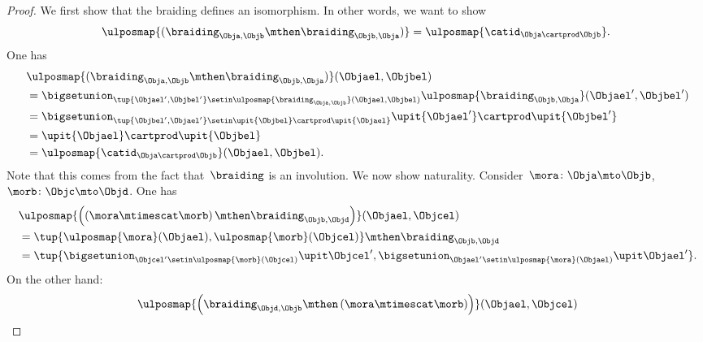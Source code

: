 \begin{proof}
    We first show that the braiding defines an isomorphism.
    In other words, we want to show
    \begin{equation*}
        \ulposmap{(\braiding_{\Obja,\Objb}\mthen \braiding_{\Objb,\Obja})}=\ulposmap{\catid_{\Obja \cartprod \Objb}}.
    \end{equation*}
    One has
    \begin{equation*}
        \begin{aligned}
            ~ & \ulposmap{(\braiding_{\Obja,\Objb}\mthen \braiding_{\Objb,\Obja})}(\Objael,\Objbel) \\
              & =\bigsetunion_{\tup{\Objael',\Objbel'}\setin \ulposmap{\braiding_{\Obja,\Objb}}(\Objael,\Objbel)}\ulposmap{\braiding_{\Objb,\Obja}}(\Objael',\Objbel') \\
              & =\bigsetunion_{\tup{\Objbel',\Objael'}\setin \upit\{\Objbel\}\cartprod \upit\{\Objael\}}\upit\{ \Objael'\}\cartprod \upit\{ \Objbel'\} \\
              & =\upit\{\Objael\} \cartprod \upit\{\Objbel\} \\
              & =\ulposmap{\catid_{\Obja\cartprod \Objb}}(\Objael,\Objbel).
        \end{aligned}
    \end{equation*}
    Note that this comes from the fact that~$\braiding$ is an involution.
    We now show naturality.
    Consider~$\mora \colon \Obja \mto \Objb$,~$\morb\colon \Objc \mto \Objd$.
    One has
    \begin{equation}
        \label{eq:braid-upos-natural-a}
        \begin{aligned}
            ~ & \ulposmap{\left(\left( \mora \mtimescat \morb\right)\mthen \braiding_{ \Objb, \Objd}\right)}(\Objael,\Objcel) \\
              & = \tup{\ulposmap{\mora}(\Objael),\ulposmap{\morb}(\Objcel)}\mthen \braiding_{ \Objb, \Objd} \\
              & =\tup{\bigsetunion_{\Objcel'\setin \ulposmap{\morb}(\Objcel)}\upit \Objcel',\bigsetunion_{\Objael'\setin \ulposmap{\mora}(\Objael)}\upit \Objael'}.
        \end{aligned}
    \end{equation}
    On the other hand:
    \begin{equation}
        \label{eq:braid-upos-natural-b}
        \begin{aligned}
            ~ & \ulposmap{\left(\braiding_{ \Objd, \Objb}\mthen \left( \mora \mtimescat \morb\right)\right)}(\Objael,\Objcel) \\

\end{aligned}
\end{equation}
\end{proof}
